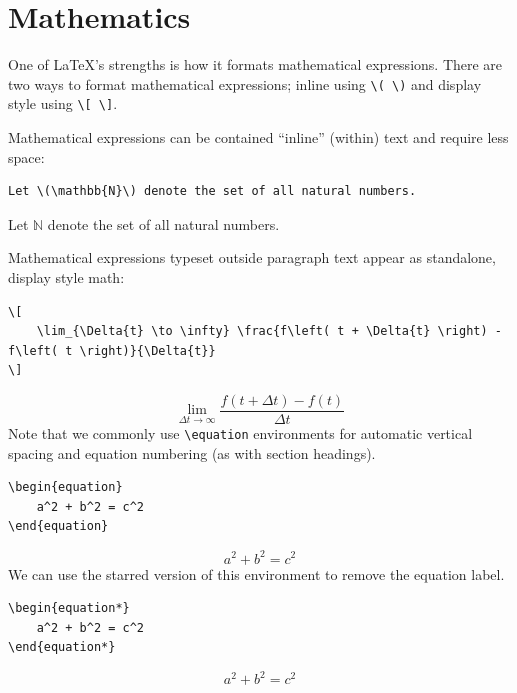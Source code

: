 \documentclass[11pt, twoside]{article}
\begin{document}
\section{Mathematics}
One of \LaTeX{}'s strengths is how it formats mathematical expressions.
There are two ways to format mathematical expressions; inline using \lstinline|\( \)| and display style using \lstinline|\[ \]|.

Mathematical expressions can be contained ``inline'' (within) text and require less space:
\begin{lstlisting}
Let \(\mathbb{N}\) denote the set of all natural numbers.
\end{lstlisting}
Let \(\mathbb{N}\) denote the set of all natural numbers.

Mathematical expressions typeset outside paragraph text appear as standalone, display style math:
\begin{lstlisting}
\[
    \lim_{\Delta{t} \to \infty} \frac{f\left( t + \Delta{t} \right) - f\left( t \right)}{\Delta{t}}
\]
\end{lstlisting}
\[
    \lim_{\Delta{t} \to \infty} \frac{f\left( t + \Delta{t} \right) - f\left( t \right)}{\Delta{t}}
\]
Note that we commonly use \lstinline|\equation| environments for automatic vertical spacing and equation numbering
(as with section headings).
\begin{lstlisting}
\begin{equation}
    a^2 + b^2 = c^2
\end{equation}
\end{lstlisting}
\begin{equation}
    a^2 + b^2 = c^2
\end{equation}
We can use the starred version of this environment to remove the equation label.
\begin{lstlisting}
\begin{equation*}
    a^2 + b^2 = c^2
\end{equation*}
\end{lstlisting}
\begin{equation*}
    a^2 + b^2 = c^2
\end{equation*}
\end{document}
